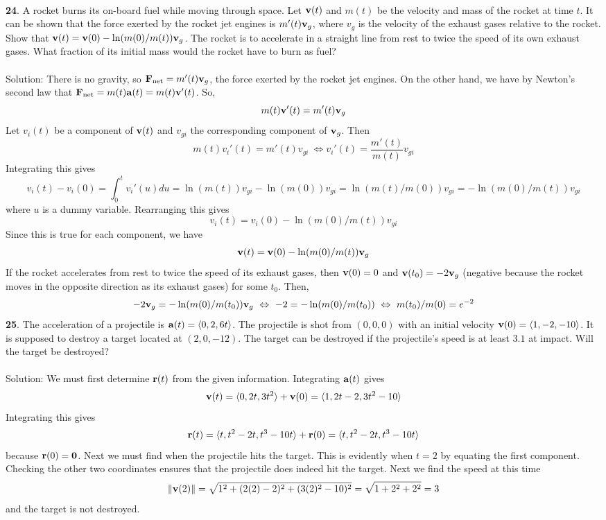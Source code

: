 \documentclass[12pt]{amsbook}
\newcommand{\la}{\langle}
\newcommand{\ra}{\rangle}
\begin{document}
\\
{\small\bf 24}. A rocket burns its on-board fuel while moving through space. Let ${\bf v}(t)$ and $m(t)$ be the velocity and mass of the rocket at time $t$. It can be shown that the force exerted by the rocket jet engines is $m'(t){\bf v}_g$, where
$v_g$ is the velocity of the exhaust gases relative to the rocket. Show that
${\bf v}(t) = {\bf v}(0)-\ln(m(0)/m(t)){\bf v}_g$. The rocket is to accelerate in a straight line
from rest to twice the speed of its own exhaust gases. What fraction of its
initial mass would the rocket have to burn as fuel?
\\
\\
{\sc Solution}: There is no gravity, so ${\bf F}_{\text{net}}=m'(t){\bf v}_g$, the force exerted by the rocket jet engines. On the other hand, we have by Newton's second law that ${\bf F}_{\text{net}}=m(t){\bf a}(t)=m(t){\bf v}'(t)$. So, 
$$m(t){\bf v}'(t)=m'(t){\bf v}_g$$
Let $v_i(t)$ be a component of ${\bf v}(t)$ and $v_{gi}$ the corresponding component of ${\bf v}_g$. Then
$$m(t)v_i'(t)=m'(t)v_{gi} \ \Leftrightarrow v_i'(t)=\frac{m'(t)}{m(t)}v_{gi}$$
Integrating this gives
$$v_i(t)-v_i(0)=\int_0^t v_i'(u)du= \ln(m(t))v_{gi}-\ln(m(0))v_{gi}=\ln(m(t)/m(0))v_{gi}=-\ln(m(0)/m(t))v_{gi}$$
where $u$ is a dummy variable. Rearranging this gives
$$v_i(t)=v_i(0)-\ln(m(0)/m(t))v_{gi}$$
Since this is true for each component, we have
$${\bf v}(t)={\bf v}(0)-\ln(m(0)/m(t)){\bf v}_g$$
If the rocket accelerates from rest to twice the speed of its exhaust gases, then ${\bf v}(0)=0$ and ${\bf v}(t_0)=-2{\bf v}_g$ (negative because the rocket moves in the opposite direction as its exhaust gases) for some $t_0$. Then,
$$ -2{\bf v}_g=-\ln(m(0)/m(t_0)){\bf v}_g \ \Leftrightarrow \ -2=-\ln(m(0)/m(t_0)) \ \Leftrightarrow \ m(t_0)/m(0)=e^{-2}$$
{\small\bf 25}. The acceleration of a projectile is ${\bf a}(t) = \la 0, 2, 6t \ra$. The projectile is shot from $(0, 0, 0)$ with an initial velocity ${\bf v}(0) = \la 1, -2, -10\ra$. It is supposed to
destroy a target located at $(2, 0, -12)$. The target can be destroyed if the
projectile’s speed is at least $3.1$ at impact. Will the target be destroyed?
\\
\\
{\sc Solution}: We must first determine ${\bf r}(t)$ from the given information. Integrating ${\bf a}(t)$ gives
$${\bf v}(t)=\la 0, 2t, 3t^2 \ra +{\bf v}(0) = \la 1, 2t-2, 3t^2-10 \ra$$
Integrating this gives 
$${\bf r}(t)=\la t, t^2-2t, t^3-10t \ra +{\bf r}(0)=\la t, t^2-2t, t^3-10t \ra$$
because ${\bf r}(0)={\bf 0}$. Next we must find when the projectile hits the target. This is evidently when $t=2$ by equating the first component. Checking the other two coordinates ensures that the projectile does indeed hit the target. Next we find the speed at this time
$$\|{\bf v}(2)\|=\sqrt{1^2+(2(2)-2)^2+(3(2)^2-10)^2}=\sqrt{1+2^2+2^2}=3$$
and the target is not destroyed.
\end{document}
